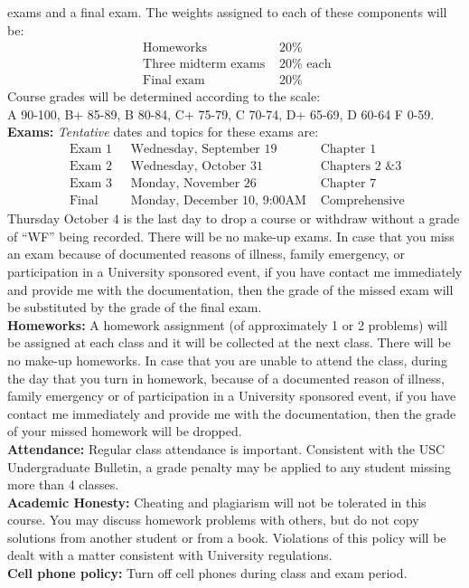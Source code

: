 \documentclass[12pt]{amsart}
\begin{document}
exams and a final exam. The weights assigned to each of these components will be:
\[
\begin{array} {ll}
\mbox{ Homeworks } & 20 \% \\
\mbox{ Three midterm exams } & 20 \% \mbox{ each} \\
\mbox{ Final exam } & 20 \%
\end{array}
\]
Course grades will be determined according to the scale:\\
A 90-100, B+ 85-89, B 80-84, C+ 75-79, C 70-74, D+ 65-69, D 60-64 F 0-59.\\[0.3cm]
{\bf Exams:} {\em Tentative} dates and topics for these exams are:
\[
\begin{array}{lll}
\mbox{ Exam 1 } & \mbox{ Wednesday, September 19} & \mbox{ Chapter } 1 \\
\mbox{ Exam 2 } & \mbox{ Wednesday, October 31} & \mbox{ Chapters 2 \& 3}\\
\mbox{ Exam 3 } & \mbox{ Monday, November 26} & \mbox{ Chapter } 7\\
\mbox{ Final} & \mbox{ Monday, December 10, 9:00AM}  & \mbox{ Comprehensive}
\end{array}
\]
Thursday October 4 is the last day to drop a course or withdraw without a grade of ``WF'' being recorded.
There will be no make-up exams. In case that you miss an exam because of  documented reasons of illness, family
emergency, or participation in a University sponsored event, if you have contact me immediately and provide me 
with the documentation, then the grade of the missed exam will be substituted by the grade of the final 
exam.\\[0.3cm]
{\bf Homeworks:} A homework assignment (of approximately 1 or 2
problems) will be assigned at each class and it will be collected at the next class. 
There will be  no make-up homeworks. In case that you are unable to attend the class,
during the day that you turn in homework, because of a documented
reason of illness, family emergency or of participation in a University
sponsored event, if you have contact me immediately and provide me with the
documentation, then the grade of your missed homework will be dropped.\\[0.3cm]
{\bf Attendance:} Regular class attendance is important. Consistent
with the USC Undergraduate Bulletin, a grade penalty may be applied to
any student missing more than 4 classes.\\[0.3cm]
{\bf Academic Honesty:} Cheating and plagiarism will not be tolerated
in this course. You may discuss homework problems with others, but do
not copy solutions from another student or from a book. Violations of
this policy will be dealt with a matter consistent with University
regulations. \\[0.3cm]
{\bf Cell phone policy:} Turn off cell phones during class and exam period.
\end{document}
